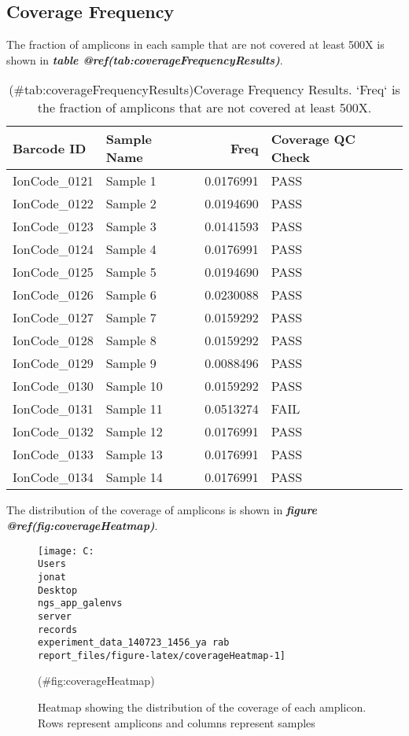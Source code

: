\documentclass[
]{article}
\begin{document}
\hypertarget{coverage-frequency}{%
\subsection{Coverage Frequency}\label{coverage-frequency}}

The fraction of amplicons in each sample that are not covered at least 500X is shown in \textbf{\emph{table @ref(tab:coverageFrequencyResults)}}.

\begin{longtable}[t]{llrl}
\caption{(\#tab:coverageFrequencyResults)Coverage Frequency Results. `Freq` is the fraction of amplicons that are not covered at least 500X.}\\
\toprule
Barcode ID & Sample Name & Freq & Coverage QC Check\\
\midrule
IonCode\_0121 & Sample 1 & 0.0176991 & PASS\\
IonCode\_0122 & Sample 2 & 0.0194690 & PASS\\
IonCode\_0123 & Sample 3 & 0.0141593 & PASS\\
IonCode\_0124 & Sample 4 & 0.0176991 & PASS\\
IonCode\_0125 & Sample 5 & 0.0194690 & PASS\\
\addlinespace
IonCode\_0126 & Sample 6 & 0.0230088 & PASS\\
IonCode\_0127 & Sample 7 & 0.0159292 & PASS\\
IonCode\_0128 & Sample 8 & 0.0159292 & PASS\\
IonCode\_0129 & Sample 9 & 0.0088496 & PASS\\
IonCode\_0130 & Sample 10 & 0.0159292 & PASS\\
\addlinespace
IonCode\_0131 & Sample 11 & 0.0513274 & FAIL\\
IonCode\_0132 & Sample 12 & 0.0176991 & PASS\\
IonCode\_0133 & Sample 13 & 0.0176991 & PASS\\
IonCode\_0134 & Sample 14 & 0.0176991 & PASS\\
\bottomrule
\end{longtable}

The distribution of the coverage of amplicons is shown in \textbf{\emph{figure @ref(fig:coverageHeatmap)}}.

\begin{figure}
\texttt{[image: C:\\Users\\jonat\\Desktop\\ngs\_app\_galenvs\\server\\records\\experiment\_data\_140723\_1456\_ya rab\\report\_files/figure-latex/coverageHeatmap-1]} \caption[Coverage Heatmap]{Heatmap showing the distribution of the coverage of each amplicon. Rows represent amplicons and columns represent samples}(\#fig:coverageHeatmap)
\end{figure}
\end{document}
